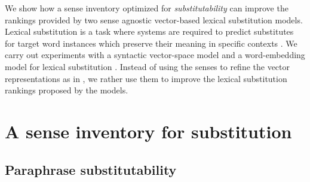 \documentclass[11pt]{article}
\begin{document}
We show how a sense inventory optimized for \textit{substitutability} can improve the rankings provided by two sense agnostic vector-based lexical substitution models. 
Lexical substitution is a task where systems are required to predict substitutes  for target word instances which preserve their meaning in specific contexts \cite{mccarthy-navigli:07}. We carry out experiments with a syntactic vector-space model \cite{apidianaki:2016:EMNLP2016} and a word-embedding model  for lexical substitution \cite{melamud-levy-dagan:2015:VSM-NLP}. %
Instead of using the senses to refine the vector representations as in \cite{faruqui-EtAl:2015:NAACL-HLT}, we rather use them to improve the lexical substitution rankings proposed by the models. %



\section{A sense inventory for substitution}

\subsection{Paraphrase substitutability}
\end{document}
